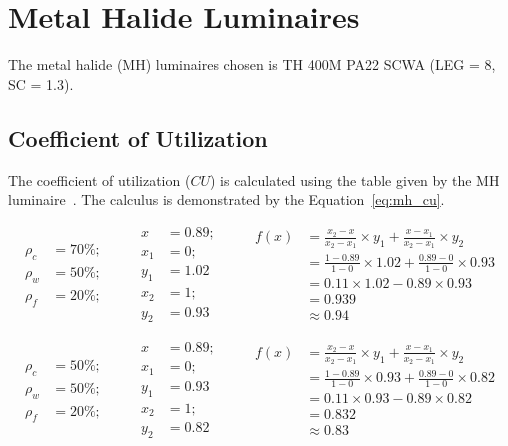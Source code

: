 \chapter{Metal Halide Luminaires}

The metal halide (MH) luminaires chosen is TH 400M PA22 SCWA (LEG = 8, SC = 1.3).

\section{Coefficient of Utilization}
The coefficient of utilization ($CU$) is calculated using the table given by the MH luminaire~\cite{www:mh_photometric}. The calculus is demonstrated by the Equation~\ref{eq:mh_cu}.

\begin{equation*}
\begin{split}
\rho_c &= 70\%; \\
\rho_w &= 50\%; \\
\rho_f &= 20\%;
\end{split}
\qquad
\begin{split}
x &= 0.89; \\
x_1 &= 0; \\ y_1 &= 1.02 \\
x_2 &= 1; \\ y_2 &= 0.93
\end{split}
\qquad
\begin{split}
f(x) &= \frac{x_2 - x}{x_2 - x_1} \times y_1 +
       \frac{x - x_1}{x_2 - x_1} \times y_2 \\
 &= \frac{1 - 0.89}{1 - 0} \times 1.02 +
    \frac{0.89 - 0}{1 - 0} \times 0.93 \\
 & = 0.11 \times 1.02 - 0.89 \times 0.93 \\
 & = 0.939 \\
 & \approx 0.94
\end{split}
\label{eq:mh_cu_interpol_1}
\end{equation*}

\begin{equation*}
\begin{split}
\rho_c &= 50\%; \\
\rho_w &= 50\%; \\
\rho_f &= 20\%;
\end{split}
\qquad
\begin{split}
x &= 0.89; \\
x_1 &= 0; \\ y_1 &= 0.93 \\
x_2 &= 1; \\ y_2 &= 0.82
\end{split}
\qquad
\begin{split}
f(x) &= \frac{x_2 - x}{x_2 - x_1} \times y_1 +
       \frac{x - x_1}{x_2 - x_1} \times y_2 \\
 &= \frac{1 - 0.89}{1 - 0} \times 0.93 +
    \frac{0.89 - 0}{1 - 0} \times 0.82 \\
 & = 0.11 \times 0.93 - 0.89 \times 0.82 \\
 & = 0.832 \\
 & \approx 0.83
\end{split}
\label{eq:mh_cu_interpol_2}
\end{equation*}

